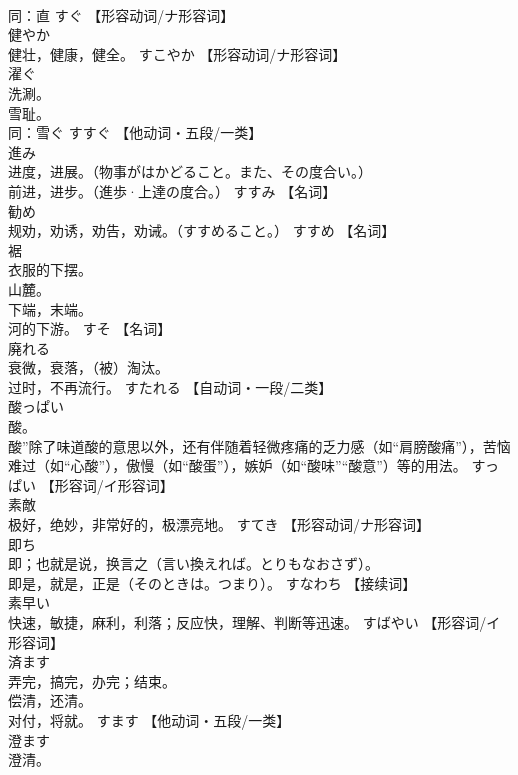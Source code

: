 \documentclass[8pt]{extreport}
\begin{document}
\begin{CJK}{UTF8}{min}
\\	同：直	すぐ		【形容动词/ナ形容词】
\\	健やか	
\\	健壮，健康，健全。	すこやか		【形容动词/ナ形容词】
\\	濯ぐ	
\\	洗涮。 
\\	雪耻。 
\\	同：雪ぐ	すすぐ		【他动词・五段/一类】
\\	進み	
\\	进度，进展。（物事がはかどること。また、その度合い。） 
\\	前进，进步。（進歩·上達の度合。）	すすみ		【名词】
\\	勧め	
\\	规劝，劝诱，劝告，劝诫。（すすめること。）	すすめ		【名词】
\\	裾	
\\	衣服的下摆。 
\\	山麓。 
\\	下端，末端。 
\\	河的下游。	すそ		【名词】
\\	廃れる	
\\	衰微，衰落，（被）淘汰。 
\\	过时，不再流行。	すたれる		【自动词・一段/二类】
\\	酸っぱい	
\\	酸。 
\\	酸”除了味道酸的意思以外，还有伴随着轻微疼痛的乏力感（如“肩膀酸痛”），苦恼难过（如“心酸”），傲慢（如“酸蛋”），嫉妒（如“酸味”“酸意”）等的用法。	すっぱい		【形容词/イ形容词】
\\	素敵	
\\	极好，绝妙，非常好的，极漂亮地。	すてき		【形容动词/ナ形容词】
\\	即ち	
\\	即；也就是说，换言之（言い換えれば。とりもなおさず）。 
\\	即是，就是，正是（そのときは。つまり）。	すなわち		【接续词】
\\	素早い	
\\	快速，敏捷，麻利，利落；反应快，理解、判断等迅速。	すばやい		【形容词/イ形容词】
\\	済ます	
\\	弄完，搞完，办完；结束。 
\\	偿清，还清。 
\\	对付，将就。	すます		【他动词・五段/一类】
\\	澄ます	
\\	澄清。 

\end{CJK}
\end{document}
